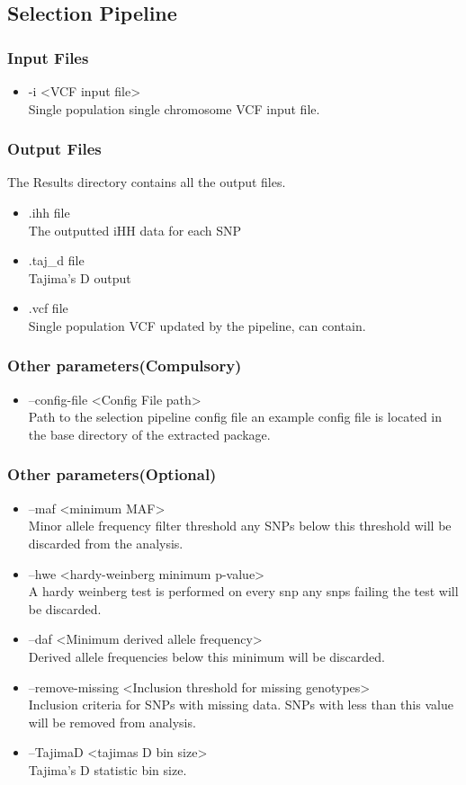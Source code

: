 \documentclass[a4paper,10pt]{article}
\begin{document}
\subsection{Selection Pipeline}
\subsubsection{Input Files}
\begin{itemize}
\item -i <VCF input file>\\
Single population single chromosome VCF input file.
\end{itemize}
\subsubsection{Output Files}
The Results directory contains all the output files.
\begin{itemize}
\item .ihh file\\
The outputted iHH data for each SNP
\item .taj\_d file\\
Tajima's D output
\item .vcf file\\
Single population VCF updated by the pipeline, can contain.
\end{itemize}
\subsubsection{Other parameters(Compulsory)}
\begin{itemize}
\item --config-file <Config File path>\\
Path to the selection pipeline config file an example config file is located in the base directory of the extracted package.
\end{itemize}
\subsubsection{Other parameters(Optional)}
\begin{itemize}
\item --maf <minimum MAF>\\
Minor allele frequency filter threshold any SNPs below this threshold will be discarded from the analysis.
\item --hwe <hardy-weinberg minimum p-value>\\
A hardy weinberg test is performed on every snp any snps failing the test will be discarded.
\item --daf <Minimum derived allele frequency>\\
Derived allele frequencies below this minimum will be discarded.
\item --remove-missing <Inclusion threshold for missing genotypes>\\
Inclusion criteria for SNPs with missing data. SNPs with less than this value will be removed from analysis.
\item --TajimaD <tajimas D bin size>\\
Tajima's D statistic bin size.
\end{itemize}
\end{document}
